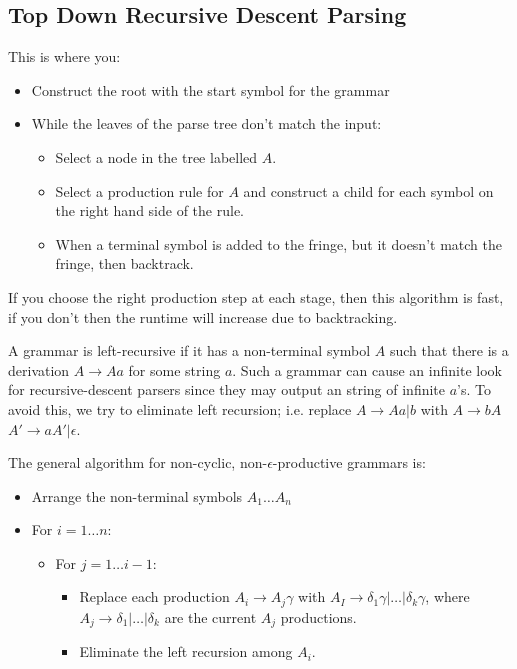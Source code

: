 
\subsection{Top Down Recursive Descent Parsing}

This is where you:

\begin{itemize}
  \item Construct the root with the start symbol for the grammar
  \item While the leaves of the parse tree don't match the input:
  \begin{itemize}
    \item Select a node in the tree labelled $A$.
    \item Select a production rule for $A$ and construct a child for each symbol
    on the right hand side of the rule.
    \item When a terminal symbol is added to the fringe, but it doesn't match
    the fringe, then backtrack.
  \end{itemize}
\end{itemize}

If you choose the right production step at each stage, then this algorithm is
fast, if you don't then the runtime will increase due to backtracking.

A grammar is left-recursive if it has a non-terminal symbol $A$ such that there
is a derivation $A \rightarrow Aa$ for some string $a$. Such a grammar can cause
an infinite look for recursive-descent parsers since they may output an string
of infinite $a$'s. To avoid this, we try to eliminate left recursion; i.e.
replace $A \rightarrow Aa | b$ with $A \rightarrow bA$ $A' \rightarrow aA' |
\epsilon$.

The general algorithm for non-cyclic, non-$\epsilon$-productive grammars is:

\begin{itemize}
  \item Arrange the non-terminal symbols $A_1 \dots A_n$
  \item For $i = 1 \dots n$:
    \begin{itemize}
      \item For $j = 1 \dots i-1$:
      \begin{itemize}
        \item Replace each production $A_i \rightarrow A_j \gamma$ with
        $A_I \rightarrow \delta_1 \gamma | \dots | \delta_k\gamma$, where
        $A_j \rightarrow \delta _1 | \dots | \delta_k$ are the current $A_j$
        productions.
        \item Eliminate the left recursion among $A_i$.
      \end{itemize}
    \end{itemize}
\end{itemize}

